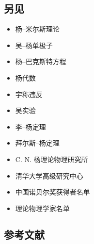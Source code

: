\subsection{另见}
\begin{itemize}
\item 杨–米尔斯理论
\item 吴–杨单极子
\item 杨–巴克斯特方程
\item 杨代数
\item 宇称违反
\item 吴实验
\item 李–杨定理
\item 拜尔斯–杨定理
\item C. N. 杨理论物理研究所
\item 清华大学高级研究中心
\item 中国诺贝尔奖获得者名单
\item 理论物理学家名单
\end{itemize}
\subsection{参考文献}  
